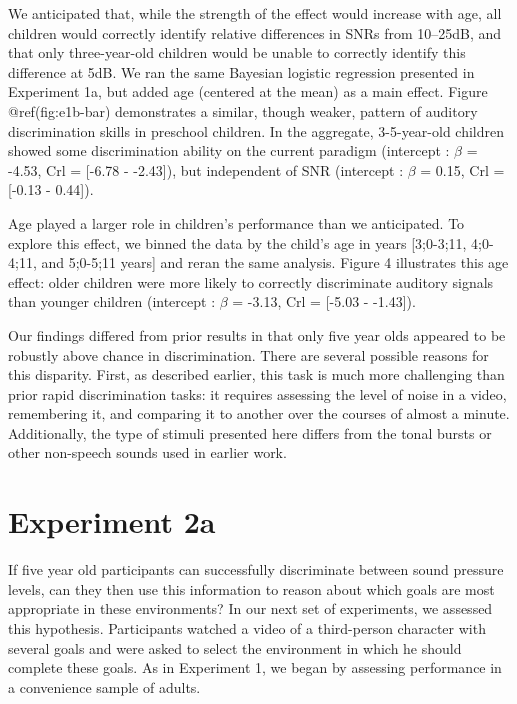 \documentclass[10pt, letterpaper]{article}
\begin{document}
We anticipated that, while the strength of the effect would increase
with age, all children would correctly identify relative differences in
SNRs from 10--25dB, and that only three-year-old children would be
unable to correctly identify this difference at 5dB. We ran the same
Bayesian logistic regression presented in Experiment 1a, but added age
(centered at the mean) as a main effect. Figure @ref(fig:e1b-bar)
demonstrates a similar, though weaker, pattern of auditory
discrimination skills in preschool children. In the aggregate,
3-5-year-old children showed some discrimination ability on the current
paradigm (intercept : \(\beta\) = -4.53, Crl = {[}-6.78 - -2.43{]}), but
independent of SNR (intercept : \(\beta\) = 0.15, Crl = {[}-0.13 -
0.44{]}).

Age played a larger role in children's performance than we anticipated.
To explore this effect, we binned the data by the child's age in years
{[}3;0-3;11, 4;0-4;11, and 5;0-5;11 years{]} and reran the same
analysis. Figure 4 illustrates this age effect: older children were more
likely to correctly discriminate auditory signals than younger children
(intercept : \(\beta\) = -3.13, Crl = {[}-5.03 - -1.43{]}).

Our findings differed from prior results in that only five year olds
appeared to be robustly above chance in discrimination. There are
several possible reasons for this disparity. First, as described
earlier, this task is much more challenging than prior rapid
discrimination tasks: it requires assessing the level of noise in a
video, remembering it, and comparing it to another over the courses of
almost a minute. Additionally, the type of stimuli presented here
differs from the tonal bursts or other non-speech sounds used in earlier
work.

\hypertarget{experiment-2a}{%
\section{Experiment 2a}\label{experiment-2a}}

If five year old participants can successfully discriminate between
sound pressure levels, can they then use this information to reason
about which goals are most appropriate in these environments? In our
next set of experiments, we assessed this hypothesis. Participants
watched a video of a third-person character with several goals and were
asked to select the environment in which he should complete these goals.
As in Experiment 1, we began by assessing performance in a convenience
sample of adults.
\end{document}
